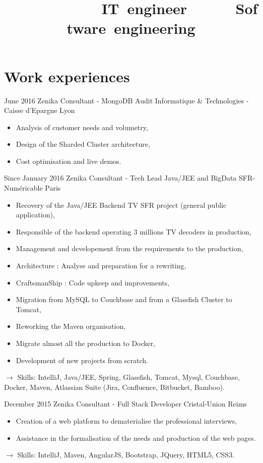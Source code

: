 \documentclass[11pt,a4paper]{moderncv}
\title{\mbox{~~~~~~~~~~~~IT engineer}\newline\mbox{~~~~~~Software engineering}} %
\begin{document}
\maketitle

\section{Work experiences}

\cventry
{June 2016}
{Zenika Consultant - MongoDB Audit}
{Informatique \& Technologies - Caisse d'Epargne}
{Lyon}
{}
{\begin{itemize}
\item Analysis of customer needs and volumetry,
\item Design of the Sharded Cluster architecture,
\item Cost optimisation and live demos.
\end{itemize}
}   %

\cventry
{Since January 2016}
{Zenika Consultant - Tech Lead Java/JEE and BigData}
{SFR-Numéricable}
{Paris}
{}
{\begin{itemize}
\item Recovery of the Java/JEE Backend TV SFR project (general public application),
\item Responsible of the backend operating 3 millions TV decoders in production,
\item Management and developement from the requirements to the production,
\item Architecture : Analyse and preparation for a rewriting,
\item CraftsmanShip : Code upkeep and improvements,
\item Migration from MySQL to Couchbase and from a Glassfish Cluster to Tomcat,
\item Reworking the Maven organisation,
\item Migrate almost all the production to Docker,
\item Development of new projects from scratch.
\end{itemize}
$\rightarrow$ Skills: IntelliJ, Java/JEE, Spring, Glassfish, Tomcat, Mysql, Couchbase, Docker, Maven, Atlassian Suite (Jira, Confluence, Bitbucket, Bamboo).
}   %

\cventry
{December 2015}
{Zenika Consultant - Full Stack Developer}
{Cristal-Union}
{Reims}
{}
{\begin{itemize}
\item Creation of a web platform to dematerialise the professional interviews,
\item Assistance in the formalisation of the needs and production of the web pages.
\end{itemize}
$\rightarrow$ Skills: IntelliJ, Maven, AngularJS, Bootstrap, JQuery, HTML5, CSS3.
}   %
\end{document}
